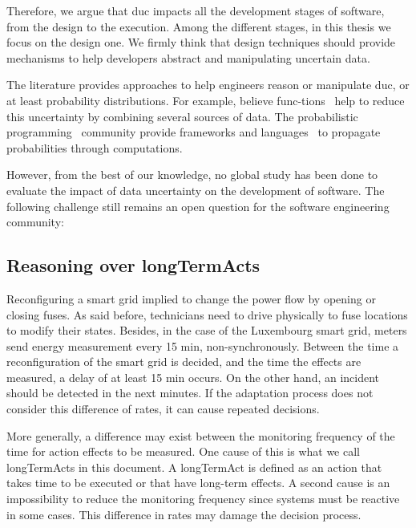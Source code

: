 Therefore, we argue that \gls{duc} impacts all the development stages of software, from the design to the execution.
Among the different stages, in this thesis we focus on the design one.
We firmly think that design techniques should provide mechanisms to help developers abstract and manipulating uncertain data.

The literature provides approaches to help engineers reason or manipulate \gls{duc}, or at least probability distributions.
For example, believe func-\linebreak{}tions~\cite{shafer1992dempster} help to reduce this uncertainty by combining several sources of data.
The probabilistic programming~\cite{DBLP:conf/icse/GordonHNR14} community provide frameworks and languages~\cite{url:InferNET18, baudin2017openturns} to propagate probabilities through computations.

However, from the best of our knowledge, no global study has been done to evaluate the impact of data uncertainty on the development of software.
The following challenge still remains an open question for the software engineering community:
\vspace{-2em}

\vfill %


\subsection[Reasoning over long-term actions]{Reasoning over \glspl{longTermAct}}
Reconfiguring a smart grid implied to change the power flow by opening or closing fuses.
As said before, technicians need to drive physically to fuse locations to modify their states.
Besides, in the case of the Luxembourg smart grid, meters send energy measurement every 15 min, non-synchronously.
Between the time a reconfiguration of the smart grid is decided, and the time the effects are measured, a delay of at least 15 min occurs.
On the other hand, an incident should be detected in the next minutes.
If the adaptation process does not consider this difference of rates, it can cause repeated decisions.

More generally, a difference may exist between the monitoring frequency of the time for action effects to be measured.
One cause of this is what we call \glspl{longTermAct} in this document.
A \gls{longTermAct} is defined as an \gls{action} that takes time to be executed or that have long-term effects.
A second cause is an impossibility to reduce the monitoring frequency since systems must be reactive in some cases.
This difference in rates may damage the decision process.

